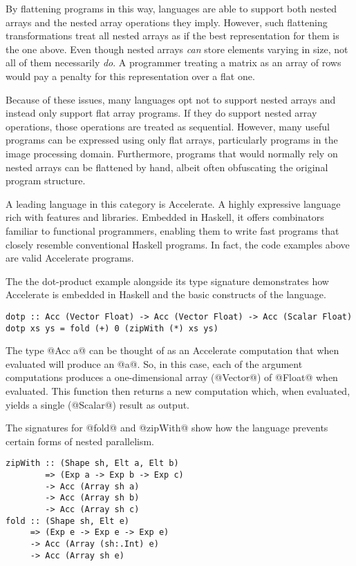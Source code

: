 By flattening programs in this way, languages are able to support both nested arrays and the nested array operations they imply. However, such flattening transformations treat all nested arrays as if the best representation for them is the one above. Even though nested arrays \emph{can} store elements varying in size, not all of them necessarily \emph{do}. A programmer treating a matrix as an array of rows would pay a penalty for this representation over a flat one.

Because of these issues, many languages opt not to support nested arrays and instead only support flat array programs. If they do support nested array operations, those operations are treated as sequential. However, many useful programs can be expressed using only flat arrays, particularly programs in the image processing domain. Furthermore, programs that would normally rely on nested arrays can be flattened by hand, albeit often obfuscating the original program structure.

A leading language in this category is Accelerate. A highly expressive language rich with features and libraries. Embedded in Haskell, it offers combinators familiar to functional programmers, enabling them to write fast programs that closely resemble conventional Haskell programs. In fact, the code examples above are valid Accelerate programs.

The the dot-product example alongside its type signature demonstrates how Accelerate is embedded in Haskell and the basic constructs of the language.

\begin{lstlisting}
dotp :: Acc (Vector Float) -> Acc (Vector Float) -> Acc (Scalar Float)
dotp xs ys = fold (+) 0 (zipWith (*) xs ys)
\end{lstlisting}

The type @Acc a@ can be thought of as an Accelerate computation that when evaluated will produce an @a@. So, in this case, each of the argument computations produces a one-dimensional array (@Vector@) of @Float@ when evaluated. This function then returns a new computation which, when evaluated, yields a single (@Scalar@) result as output.

The signatures for @fold@ and @zipWith@ show how the language prevents certain forms of nested parallelism.

\begin{lstlisting}
zipWith :: (Shape sh, Elt a, Elt b)
        => (Exp a -> Exp b -> Exp c)
        -> Acc (Array sh a)
        -> Acc (Array sh b)
        -> Acc (Array sh c)
fold :: (Shape sh, Elt e)
     => (Exp e -> Exp e -> Exp e)
     -> Acc (Array (sh:.Int) e)
     -> Acc (Array sh e)
\end{lstlisting}

